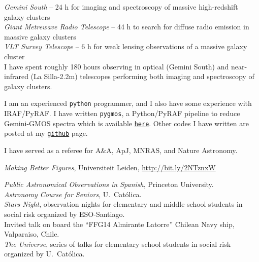 \documentclass[11pt]{article}
\begin{document}

\noindent
\emph{Gemini South} -- 24 h for imaging and spectroscopy of massive 
high-redshift galaxy clusters\\
\emph{Giant Metrewave Radio Telescope} -- 44 h to search for diffuse radio 
emission in massive galaxy clusters\\
\emph{VLT Survey Telescope} -- 6 h for weak lensing observations of a massive 
galaxy cluster\\


{I have spent roughly 180 hours observing in 
optical (Gemini South) and near-infrared (La Silla-2.2m) telescopes performing both 
imaging and spectroscopy of galaxy clusters.}



I am an experienced \texttt{python} programmer, and I also have some experience 
with IRAF/PyRAF. I have written {\tt pygmos}, a Python/PyRAF pipeline to reduce 
Gemini-GMOS spectra which is available 
\href{https://github.com/cristobal-sifon/pygmos/}{\texttt{here}}. Other codes I 
have written are posted at my 
\href{https://github.com/cristobal-sifon}{\texttt{github}} page.\\


%


\noindent
I have served as a referee for A\&A, ApJ, MNRAS, and Nature Astronomy.


\noindent
{} \emph{Making Better Figures}, Universiteit Leiden, \url{http://bit.ly/2NTznxW}


\noindent
{} \emph{Public Astronomical Observations in Spanish}, Princeton University.\\
 \emph{Astronomy Course for Seniors}, U.\ Cat\'olica.\\
 \emph{Stars Night}, observation nights for elementary and middle school students in social risk organized by ESO-Santiago.\\
 Invited talk on board the ``FFG14 Almirante Latorre'' Chilean Navy ship, Valparaiso, Chile.\\
 \emph{The Universe}, series of talks for elementary school students in social risk organized by U.\ Cat\'olica.\\
\end{document}

